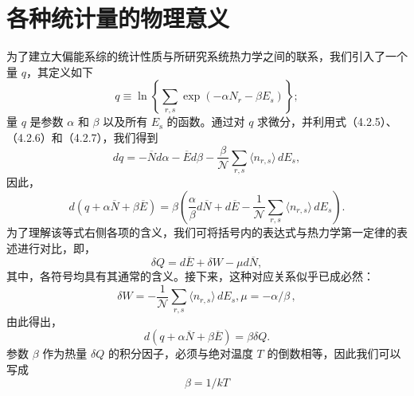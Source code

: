 \section{各种统计量的物理意义}\label{ux5404ux79cdux7edfux8ba1ux91cfux7684ux7269ux7406ux610fux4e49}
为了建立大偏能系综的统计性质与所研究系统热力学之间的联系，我们引入了一个量 \(q\)，其定义如下
\begin{equation}\tag{4.3.1}\label{eq:4.3.1}
q \equiv \ln \left\{ \sum _ { r , s } \exp \left( - \alpha N _ { r } - \beta E _ { s } \right) \right\} ;
\end{equation}
量 \(q\) 是参数 \(\alpha\) 和 \(\beta\) 以及所有 \(E_{\mathrm{s}}\) 的函数。通过对 \(q\) 求微分，并利用式（4.2.5）、（4.2.6）和（4.2.7），我们得到
\begin{equation}\tag{4.3.2}\label{eq:4.3.2}
d q = - \overline { { { N } } } d \alpha - \overline { { { E } } } d \beta - \frac { \beta } { \mathcal { N } } \sum _ { r , s } \langle n _ { r , s } \rangle \, d E _ { s } ,
\end{equation}
因此，
\begin{equation}\tag{4.3.3}\label{eq:4.3.3}
d ( q + \alpha \overline { { { N } } } + \beta \overline { { { E } } } ) = \beta \left( \frac { \alpha } { \beta } d \overline { { { N } } } + d \overline { { { E } } } - \frac { 1 } { \mathcal { N } } \sum _ { r , s } \langle n _ { r , s } \rangle \, d E _ { s } \right) .
\end{equation}
为了理解该等式右侧各项的含义，我们可将括号内的表达式与热力学第一定律的表述进行对比，即，
\begin{equation}\tag{4.3.4}\label{eq:4.3.4}
\delta Q = d \overline { { { E } } } + \delta W - \mu d \overline { { { N } } } ,
\end{equation}
其中，各符号均具有其通常的含义。接下来，这种对应关系似乎已成必然：
\begin{equation}\tag{4.3.5}\label{eq:4.3.5}
\delta W = - \frac { 1 } { \mathcal { N } } \sum _ { r , s } \langle n _ { r , s } \rangle \, d E _ { s } ,  \mu = - \alpha / \beta \, ,
\end{equation}
由此得出，
\begin{equation}\tag{4.3.6}\label{eq:4.3.6}
d ( q + \alpha \overline { { N } } + \beta \overline { { E } } ) = \beta \delta Q .
\end{equation}
参数 \(\beta\) 作为热量 \(\delta Q\) 的积分因子，必须与绝对温度 \(T\) 的倒数相等，因此我们可以写成
\begin{equation}\tag{4.3.7}\label{eq:4.3.7}
\beta = 1 / k T
\end{equation}
